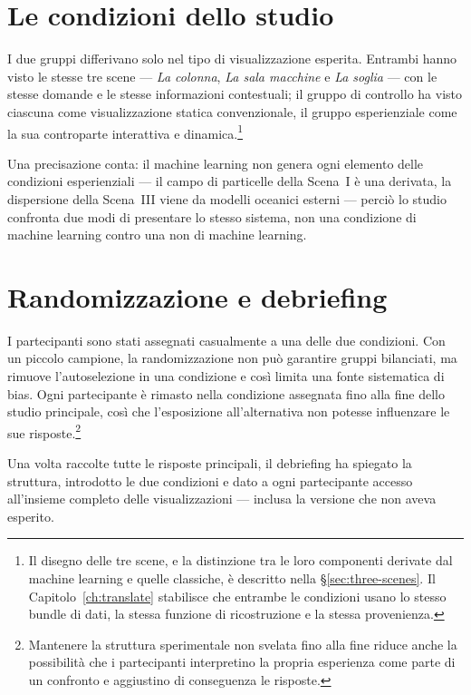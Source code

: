 \section{Le condizioni dello studio}
\label{sec:eval-conditions}

I due gruppi differivano solo nel tipo di visualizzazione esperita. Entrambi hanno visto le stesse tre scene --- \textit{La colonna}, \textit{La sala macchine} e \textit{La soglia} --- con le stesse domande e le stesse informazioni contestuali; il gruppo di controllo ha visto ciascuna come visualizzazione statica convenzionale, il gruppo esperienziale come la sua controparte interattiva e dinamica.\footnote{Il disegno delle tre scene, e la distinzione tra le loro componenti derivate dal machine learning e quelle classiche, è descritto nella \S\ref{sec:three-scenes}. Il Capitolo~\ref{ch:translate} stabilisce che entrambe le condizioni usano lo stesso bundle di dati, la stessa funzione di ricostruzione e la stessa provenienza.}

Una precisazione conta: il machine learning non genera ogni elemento delle condizioni esperienziali --- il campo di particelle della Scena~I è una derivata, la dispersione della Scena~III viene da modelli oceanici esterni --- perciò lo studio confronta due modi di presentare lo stesso sistema, non una condizione di machine learning contro una non di machine learning.

\section{Randomizzazione e debriefing}
\label{sec:eval-randomisation}

I partecipanti sono stati assegnati casualmente a una delle due condizioni. Con un piccolo campione, la randomizzazione non può garantire gruppi bilanciati, ma rimuove l'autoselezione in una condizione e così limita una fonte sistematica di bias. Ogni partecipante è rimasto nella condizione assegnata fino alla fine dello studio principale, così che l'esposizione all'alternativa non potesse influenzare le sue risposte.\footnote{Mantenere la struttura sperimentale non svelata fino alla fine riduce anche la possibilità che i partecipanti interpretino la propria esperienza come parte di un confronto e aggiustino di conseguenza le risposte.}

Una volta raccolte tutte le risposte principali, il debriefing ha spiegato la struttura, introdotto le due condizioni e dato a ogni partecipante accesso all'insieme completo delle visualizzazioni --- inclusa la versione che non aveva esperito.

